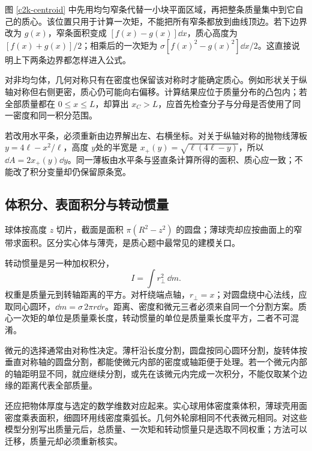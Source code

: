 图 \ref{c2k-centroid} 中先用均匀窄条代替一小块平面区域，再把整条质量集中到它自己的质心。该位置只用于计算一次矩，不能把所有窄条都放到曲线顶边。若下边界改为 $g(x)$，窄条面积变成 $[f(x)-g(x)]\dd x$，质心高度为 $[f(x)+g(x)]/2$；相乘后的一次矩为 $\sigma[f(x)^2-g(x)^2]\dd x/2$。这直接说明上下两条边界都怎样进入公式。

对非均匀体，几何对称只有在密度也保留该对称时才能确定质心。例如形状关于纵轴对称但右侧更密，质心仍可能向右偏移。计算结果应位于质量分布的凸包内；若全部质量都在 $0\le x\le L$，却算出 $x_C>L$，应首先检查分子与分母是否使用了同一密度和同一积分范围。

若改用水平条，必须重新由边界解出左、右横坐标。对关于纵轴对称的抛物线薄板 $y=4\ell-x^2/\ell$，高度 $y$处的半宽是 $x_+(y)=\sqrt{\ell(4\ell-y)}$，所以 $\dd A=2x_+(y)\dd y$。同一薄板由水平条与竖直条计算所得的面积、质心应一致；不能改了积分变量却仍保留原条宽。



\subsection{体积分、表面积分与转动惯量}
球体按高度 $z$ 切片，截面是面积 $\pi(R^2-z^2)$ 的圆盘；薄球壳却应按曲面上的窄带求面积。区分实心体与薄壳，是质心题中最常见的建模关口。

转动惯量是另一种加权积分，
\[
 I=\int r_\perp^2\,\dd m.
\]
权重是质量元到转轴距离的平方。对杆绕端点轴，$r_\perp=x$；对圆盘绕中心法线，应取同心圆环，$\dd m=\sigma\,2\pi r\dd r$。距离、密度和微元三者必须来自同一个分割方案。质心一次矩的单位是质量乘长度，转动惯量的单位是质量乘长度平方，二者不可混淆。

微元的选择通常由对称性决定。薄杆沿长度分割，圆盘按同心圆环分割，旋转体按垂直对称轴的圆盘分割，都能使微元内部的密度或轴距便于处理。若一个微元内部的轴距明显不同，就应继续分割，或先在该微元内完成一次积分，不能仅取某个边缘的距离代表全部质量。

还应把物体厚度与选定的数学维数对应起来。实心球用体密度乘体积，薄球壳用面密度乘表面积，细圆环用线密度乘弧长。几何外轮廓相同不代表微元相同。对这些模型分别写出质量元后，总质量、一次矩和转动惯量只是选取不同权重；方法可以迁移，质量元却必须重新核实。


